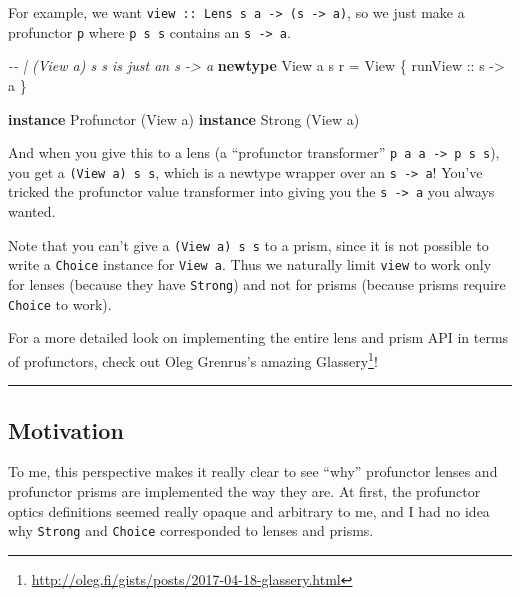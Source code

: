 \documentclass[]{article}
\newenvironment{Shaded}{}{}
\newcommand{\CommentTok}[1]{\textcolor[rgb]{0.38,0.63,0.69}{\textit{#1}}}
\newcommand{\DataTypeTok}[1]{\textcolor[rgb]{0.56,0.13,0.00}{#1}}
\newcommand{\KeywordTok}[1]{\textcolor[rgb]{0.00,0.44,0.13}{\textbf{#1}}}
\newcommand{\NormalTok}[1]{#1}
\newcommand{\OtherTok}[1]{\textcolor[rgb]{0.00,0.44,0.13}{#1}}
\renewcommand{\href}[2]{#2\footnote{\url{#1}}}
\begin{document}
For example, we want
\texttt{view\ ::\ Lens\textquotesingle{}\ s\ a\ -\textgreater{}\ (s\ -\textgreater{}\ a)},
so we just make a profunctor \texttt{p} where \texttt{p\ s\ s} contains an
\texttt{s\ -\textgreater{}\ a}.

\begin{Shaded}
\begin{Highlighting}[]
\CommentTok{{-}{-} | \textasciigrave{}(View a) s s\textasciigrave{} is just an \textasciigrave{}s {-}> a\textasciigrave{}}
\KeywordTok{newtype} \DataTypeTok{View}\NormalTok{ a s r }\OtherTok{=} \DataTypeTok{View}\NormalTok{ \{}\OtherTok{ runView ::}\NormalTok{ s }\OtherTok{{-}>}\NormalTok{ a \}}

\KeywordTok{instance} \DataTypeTok{Profunctor}\NormalTok{ (}\DataTypeTok{View}\NormalTok{ a)}
\KeywordTok{instance} \DataTypeTok{Strong}\NormalTok{ (}\DataTypeTok{View}\NormalTok{ a)}
\end{Highlighting}
\end{Shaded}

And when you give this to a lens (a ``profunctor transformer''
\texttt{p\ a\ a\ -\textgreater{}\ p\ s\ s}), you get a \texttt{(View\ a)\ s\ s},
which is a newtype wrapper over an \texttt{s\ -\textgreater{}\ a}! You've
tricked the profunctor value transformer into giving you the
\texttt{s\ -\textgreater{}\ a} you always wanted.

Note that you can't give a \texttt{(View\ a)\ s\ s} to a prism, since it is not
possible to write a \texttt{Choice} instance for \texttt{View\ a}. Thus we
naturally limit \texttt{view} to work only for lenses (because they have
\texttt{Strong}) and not for prisms (because prisms require \texttt{Choice} to
work).

For a more detailed look on implementing the entire lens and prism API in terms
of profunctors, check out Oleg Grenrus's amazing
\href{http://oleg.fi/gists/posts/2017-04-18-glassery.html}{Glassery}!

\begin{center}\rule{0.5\linewidth}{\linethickness}\end{center}

\hypertarget{motivation}{%
\subsection{Motivation}\label{motivation}}

To me, this perspective makes it really clear to see ``why'' profunctor lenses
and profunctor prisms are implemented the way they are. At first, the profunctor
optics definitions seemed really opaque and arbitrary to me, and I had no idea
why \texttt{Strong} and \texttt{Choice} corresponded to lenses and prisms.
\end{document}
